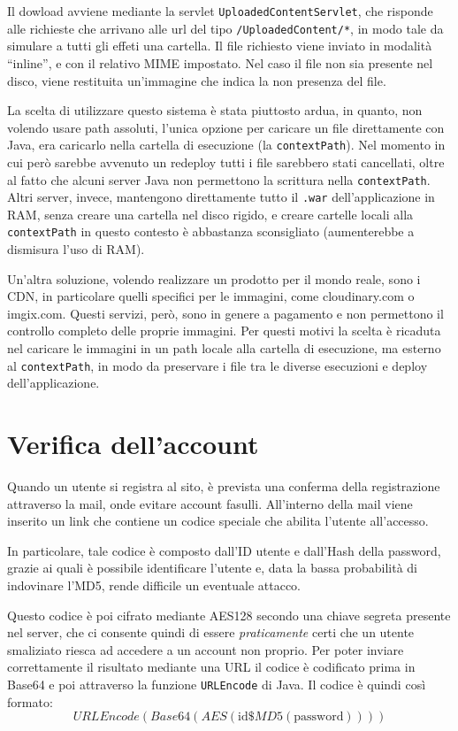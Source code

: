 Il dowload avviene mediante la servlet \texttt{UploadedContentServlet}, che risponde alle richieste che arrivano alle url del tipo \texttt{/UploadedContent/*}, in modo tale da simulare a tutti gli effeti una cartella. Il file richiesto viene inviato in modalità ``inline'', e con il relativo MIME impostato. Nel caso il file non sia presente nel disco, viene restituita un'immagine che indica la non presenza del file.

La scelta di utilizzare questo sistema è stata piuttosto ardua, in quanto, non volendo usare path assoluti, l'unica opzione per caricare un file direttamente con Java, era caricarlo nella cartella di esecuzione (la \texttt{contextPath}). Nel momento in cui però sarebbe avvenuto un redeploy tutti i file sarebbero stati cancellati, oltre al fatto che alcuni server Java non permettono la scrittura nella \texttt{contextPath}. Altri server, invece, mantengono direttamente tutto il \texttt{.war} dell'applicazione in RAM, senza creare una cartella nel disco rigido, e creare cartelle locali alla \texttt{contextPath} in questo contesto è abbastanza sconsigliato (aumenterebbe a dismisura l'uso di RAM).

Un'altra soluzione, volendo realizzare un prodotto per il mondo reale, sono i CDN, in particolare quelli specifici per le immagini, come cloudinary.com o imgix.com. Questi servizi, però, sono in genere a pagamento e non permettono il controllo completo delle proprie immagini. Per questi motivi la scelta è ricaduta nel caricare le immagini in un path locale alla cartella di esecuzione, ma esterno al \texttt{contextPath}, in modo da preservare i file tra le diverse esecuzioni e deploy dell'applicazione.




\chapter{Verifica dell'account}

Quando un utente si registra al sito, è prevista una conferma della registrazione attraverso la mail, onde evitare account fasulli. All'interno della mail viene inserito un link che contiene un codice speciale che abilita l'utente all'accesso.

In particolare, tale codice è composto dall'ID utente e dall'Hash della password, grazie ai quali è possibile identificare l'utente e, data la bassa probabilità di indovinare l'MD5, rende difficile un eventuale attacco.

Questo codice è poi cifrato mediante AES128 secondo una chiave segreta presente nel server, che ci consente quindi di essere \textit{praticamente} certi che un utente smaliziato riesca ad accedere a un account non proprio. Per poter inviare correttamente il risultato mediante una URL il codice è codificato prima in Base64 e poi attraverso la funzione \texttt{URLEncode} di Java. Il codice è quindi così formato:
\[
    URLEncode( Base64( AES( \mbox{id}\$MD5(\mbox{password}))))
\]

